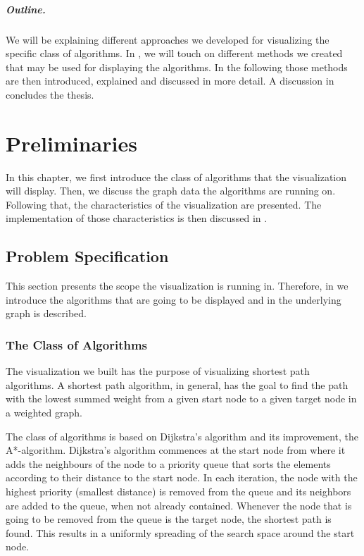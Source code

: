 \documentclass
[
    paper = a4,
    pagesize,
    12 pt,
    twoside,                       %
    open = right,
    DIV = calc,
    BCOR = 0 mm,                   %
    bibtotoc
]
{scrbook}
\begin{document}
\paragraph{Outline.} We will be explaining different approaches we developed for visualizing the specific class of algorithms.
In , we will touch on different methods we created that may be used for displaying the algorithms.
In the following  those methods are then introduced, explained and discussed in more detail.
A discussion in  concludes the thesis.


\chapter{Preliminaries} \label{questions}

In this chapter, we first introduce the class of algorithms that the visualization will display.
Then, we discuss the graph data the algorithms are running on.
Following that, the characteristics of the visualization are presented.
The implementation of those characteristics is then discussed in .


\section{Problem Specification} \label{specification}

This section presents the scope the visualization is running in.
Therefore, in  we introduce the algorithms that are going to be displayed and in  the underlying graph is described.

\subsection{The Class of Algorithms} \label{framework}

The visualization we built has the purpose of visualizing shortest path algorithms.
A shortest path algorithm, in general, has the goal to find the path with the lowest summed weight from a given start node to a given target node in a weighted graph.

The class of algorithms is based on Dijkstra's algorithm\cite{DIJKSTRA1959} and its improvement, the A*-algorithm\cite{4082128}.
Dijkstra's algorithm commences at the start node from where it adds the neighbours of the node to a priority queue that sorts the elements according to their distance to the start node.
In each iteration, the node with the highest priority (smallest distance) is removed from the queue and its neighbors are added to the queue, when not already contained.
Whenever the node that is going to be removed from the queue is the target node, the shortest path is found.
This results in a uniformly spreading of the search space around the start node.
\end{document}
